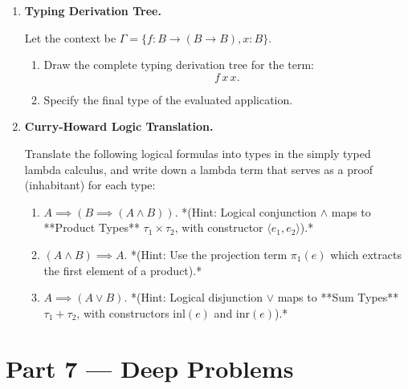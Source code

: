 \documentclass[12pt, a4paper]{book}
\begin{document}
\begin{problembox}
\begin{enumerate}[label=\textbf{P\arabic*.}]
  \item \textbf{Typing Derivation Tree.}
  
        Let the context be $\Gamma = \{f : B \to (B \to B), x : B\}$.
        \begin{enumerate}[label=(\alph*)]
          \item Draw the complete typing derivation tree for the term:
                \[
                  f \, x \, x.
                \]
          \item Specify the final type of the evaluated application.
        \end{enumerate}

  \item \textbf{Curry-Howard Logic Translation.}
  
        Translate the following logical formulas into types in the simply typed lambda calculus, and write down a lambda term that serves as a proof (inhabitant) for each type:
        \begin{enumerate}[label=(\alph*)]
          \item $A \implies (B \implies (A \land B))$.
                *(Hint: Logical conjunction $\land$ maps to **Product Types** $\tau_1 \times \tau_2$, with constructor $\langle e_1, e_2 \rangle$).*
          \item $(A \land B) \implies A$.
                *(Hint: Use the projection term $\pi_1(e)$ which extracts the first element of a product).*
          \item $A \implies (A \lor B)$.
                *(Hint: Logical disjunction $\lor$ maps to **Sum Types** $\tau_1 + \tau_2$, with constructors $\text{inl}(e)$ and $\text{inr}(e)$).*
        \end{enumerate}
\end{enumerate}
\end{problembox}

\newpage

\section{Part 7 --- Deep Problems}
\end{document}

